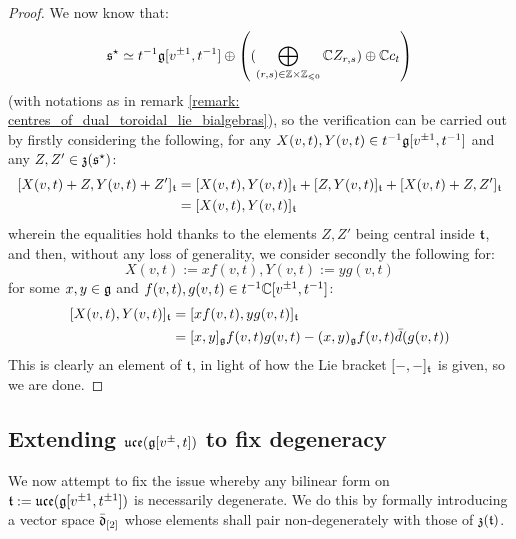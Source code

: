                 \begin{proof}
                    We now know that:
                        $$\s^{\star} \cong t^{-1}\g[v^{\pm 1}, t^{-1}] \oplus \left( ( \bigoplus_{(r, s) \in \Z \x \Z_{\leq 0}} \bbC Z_{r, s}) \oplus \bbC c_t \right)$$
                    (with notations as in remark \ref{remark: centres_of_dual_toroidal_lie_bialgebras}), so the verification can be carried out by firstly considering the following, for any $X(v, t), Y(v, t) \in t^{-1}\mathfrak{g}[v^{\pm 1}, t^{-1}]$ and any $Z, Z' \in \mathfrak{z}(\mathfrak{s}^{\star})$:
                        $$
                            \begin{aligned}
                                [ X(v, t) + Z, Y(v, t) + Z' ]_{\t} & = [ X(v, t), Y(v, t) ]_{\t} + [ Z, Y(v, t) ]_{\t} + [X(v, t) + Z, Z']_{\t}
                                \\
                                & = [ X(v, t), Y(v, t) ]_{\t}
                            \end{aligned}
                        $$
                    wherein the equalities hold thanks to the elements $Z, Z'$ being central inside $\mathfrak{t}$, and then, without any loss of generality, we consider secondly the following for:
                        $$X(v, t) := x f(v, t), Y(v, t) := y g(v, t)$$
                    for some $x, y \in \mathfrak{g}$ and $f(v, t), g(v, t) \in t^{-1}\mathbb{C}[v^{\pm 1}, t^{-1}]$:
                        $$
                            \begin{aligned}
                                [ X(v, t), Y(v, t) ]_{\t} & = [ x f(v, t), y g(v, t) ]_{\t}
                                \\
                                & = [x, y]_{\g} f(v, t) g(v, t) - (x, y)_{\g} f(v, t) \bar{d}( g(v, t) )
                            \end{aligned}
                        $$
                    This is clearly an element of $\mathfrak{t}$, in light of how the Lie bracket $[-, -]_{\mathfrak{t}}$ is given, so we are done. 
                \end{proof}

        \subsection{Extending \texorpdfstring{$ \mathfrak{uce}(\mathfrak{g}[v^{\pm}, t]) $}{} to fix degeneracy}
            We now attempt to fix the issue whereby any bilinear form on $\mathfrak{t} := \mathfrak{uce}(\mathfrak{g}[v^{\pm 1}, t^{\pm 1}])$ is necessarily degenerate. We do this by formally introducing a  vector space $\bar{\mathfrak{d}}_{[2]}$ whose elements shall pair non-degenerately with those of $\mathfrak{z}(\mathfrak{t})$. 

